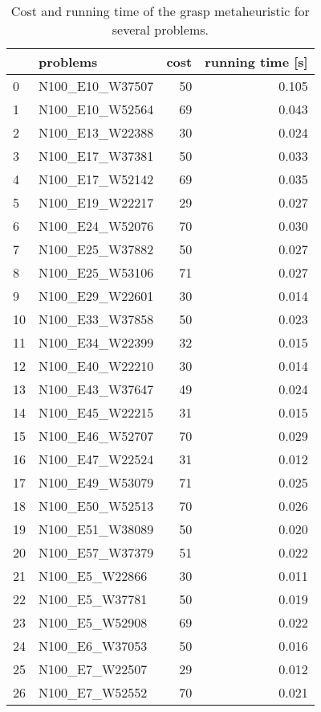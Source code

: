 \begin{table}[H]
\centering
\begin{tabular}{llrr}
\toprule
{} &            problems &  cost &  running time [s] \\
\midrule
0  &     N100\_E10\_W37507 &    50 &             0.105 \\
1  &     N100\_E10\_W52564 &    69 &             0.043 \\
2  &     N100\_E13\_W22388 &    30 &             0.024 \\
3  &     N100\_E17\_W37381 &    50 &             0.033 \\
4  &     N100\_E17\_W52142 &    69 &             0.035 \\
5  &     N100\_E19\_W22217 &    29 &             0.027 \\
6  &     N100\_E24\_W52076 &    70 &             0.030 \\
7  &     N100\_E25\_W37882 &    50 &             0.027 \\
8  &     N100\_E25\_W53106 &    71 &             0.027 \\
9  &     N100\_E29\_W22601 &    30 &             0.014 \\
10 &     N100\_E33\_W37858 &    50 &             0.023 \\
11 &     N100\_E34\_W22399 &    32 &             0.015 \\
12 &     N100\_E40\_W22210 &    30 &             0.014 \\
13 &     N100\_E43\_W37647 &    49 &             0.024 \\
14 &     N100\_E45\_W22215 &    31 &             0.015 \\
15 &     N100\_E46\_W52707 &    70 &             0.029 \\
16 &     N100\_E47\_W22524 &    31 &             0.012 \\
17 &     N100\_E49\_W53079 &    71 &             0.025 \\
18 &     N100\_E50\_W52513 &    70 &             0.026 \\
19 &     N100\_E51\_W38089 &    50 &             0.020 \\
20 &     N100\_E57\_W37379 &    51 &             0.022 \\
21 &      N100\_E5\_W22866 &    30 &             0.011 \\
22 &      N100\_E5\_W37781 &    50 &             0.019 \\
23 &      N100\_E5\_W52908 &    69 &             0.022 \\
24 &      N100\_E6\_W37053 &    50 &             0.016 \\
25 &      N100\_E7\_W22507 &    29 &             0.012 \\
26 &      N100\_E7\_W52552 &    70 &             0.021 \\
\bottomrule
\end{tabular}
\caption{Cost and running time of the grasp metaheuristic for several problems.}
\label{table:tabu-medium-results-I}
\end{table}

